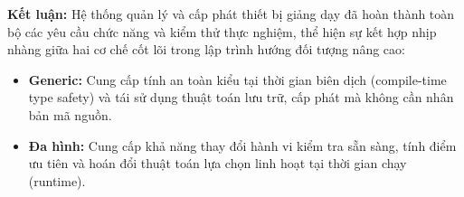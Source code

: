 \documentclass[11pt,a4paper]{article}
\begin{document}
\vspace{0.15cm}

\noindent\textbf{Kết luận:}
Hệ thống quản lý và cấp phát thiết bị giảng dạy đã hoàn thành toàn bộ các yêu cầu chức năng và kiểm thử thực nghiệm, thể hiện sự kết hợp nhịp nhàng giữa hai cơ chế cốt lõi trong lập trình hướng đối tượng nâng cao:
\begin{itemize}[itemsep=1.5pt]
    \item \textbf{Generic:} Cung cấp tính an toàn kiểu tại thời gian biên dịch (compile-time type safety) và tái sử dụng thuật toán lưu trữ, cấp phát mà không cần nhân bản mã nguồn.
    \item \textbf{Đa hình:} Cung cấp khả năng thay đổi hành vi kiểm tra sẵn sàng, tính điểm ưu tiên và hoán đổi thuật toán lựa chọn linh hoạt tại thời gian chạy (runtime).
\end{itemize}
\end{document}
